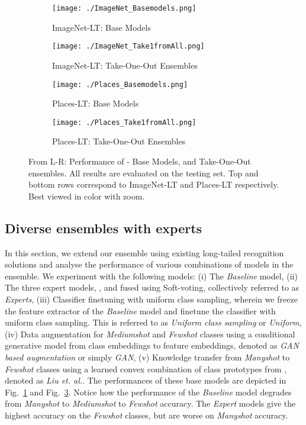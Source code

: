 \documentclass[runningheads]{llncs}
\begin{document}
\begin{figure*}[!t]
    \centering
    \begin{subfigure}[t]{0.49\textwidth}
        \texttt{[image: ./ImageNet\_Basemodels.png]}
        \caption{ImageNet-LT: Base Models}
        \label{fig:imagenet_base}
        \end{subfigure}
    \begin{subfigure}[t]{0.49\textwidth}
        \texttt{[image: ./ImageNet\_Take1fromAll.png]} 
        \caption{ImageNet-LT: Take-One-Out Ensembles}
        \label{fig:imagenet_take1away}
        \end{subfigure}
    \begin{subfigure}[t]{0.49\textwidth}
        \texttt{[image: ./Places\_Basemodels.png]}
        \caption{Places-LT: Base Models}
        \label{fig:places_base}
        \end{subfigure}
    \begin{subfigure}[t]{0.49\textwidth}
        \texttt{[image: ./Places\_Take1fromAll.png]} 
        \caption{Places-LT: Take-One-Out Ensembles}
        \label{fig:places_take1away}
        \end{subfigure}
   \caption{From L-R: Performance of - Base Models, and Take-One-Out ensembles. All results are evaluated on the testing set. Top and bottom rows correspond to ImageNet-LT and Places-LT respectively. Best viewed in color with zoom.} 
    \label{fig:ensemblecombination_ablation}
    \vspace{-4mm}
\end{figure*}


\subsection{Diverse ensembles with experts}
In this section, we extend our ensemble using existing long-tailed recognition solutions and analyse the performance of various combinations of models in the ensemble. We experiment with the following models: (i) The \emph{Baseline} model, (ii) The three expert models, ,  and  fused using Soft-voting, collectively referred to as \emph{Experts}, (iii) Classifier finetuning with uniform class sampling, wherein we freeze the feature extractor of the \emph{Baseline} model and finetune the classifier with uniform class sampling. This is referred to as \emph{Uniform class sampling} or \emph{Uniform}, (iv) Data augmentation for \emph{Mediumshot} and \emph{Fewshot} classes using a conditional generative model from class embeddings to feature embeddings, denoted as \emph{GAN based augmentation} or simply \emph{GAN}, (v) Knowledge transfer from \emph{Manyshot} to \emph{Fewshot} classes using a learned convex combination of class prototypes from \cite{liu2019large}, denoted as \emph{Liu et. al.}. The performances of these base models are depicted in Fig.~\ref{fig:imagenet_base} and Fig.~\ref{fig:places_base}. Notice how the performance of the \emph{Baseline} model degrades from \emph{Manyshot} to \emph{Mediumshot} to \emph{Fewshot} accuracy. The \emph{Expert} models give the highest accuracy on the \emph{Fewshot} classes, but are worse on \emph{Manyshot} accuracy. 
\end{document}
